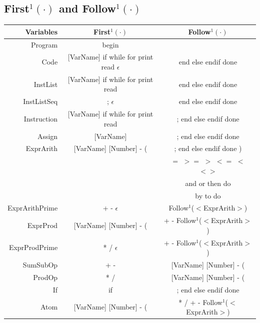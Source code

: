 \documentclass[letterpaper]{article}
\begin{document}
\subsection{First$^1(\cdot)$ and Follow$^1(\cdot)$}
\begin{center}
    \renewcommand{\arraystretch}{1.5}
    \begin{tabular}{| r || c | c |}
        \hline
        \textbf{Variables} & \textbf{First$^1(\cdot)$}
        & \textbf{Follow$^1(\cdot)$} \\
        \hline
        \hline
        Program & begin & \\
        \hline
        Code & [VarName] if while for print read $\epsilon$ &
        end else endif done \\
        \hline
        InstList & [VarName] if while for print read &
        end else endif done \\
        \hline
        InstListSeq & ; $\epsilon$ &
        end else endif done \\
        \hline
        Instruction & [VarName] if while for print read &
        ; end else endif done \\
        \hline
        Assign & [VarName] &
        ; end else endif done \\
        \hline
        ExprArith & [VarName] [Number] - ( &
        ; end else endif done ) \\
        & & $=$ $>=$ $>$ $<=$ $<$ $<>$ \\
        & & and or then do \\
        & &  by to do\\
        \hline
        ExprArithPrime & + - $\epsilon$ &
        Follow$^1$($<$ExprArith$>$) \\
        \hline
        ExprProd & [VarName] [Number] - ( &
        + - Follow$^1$($<$ExprArith$>$) \\
        \hline
        ExprProdPrime & * / $\epsilon$ &
        + - Follow$^1$($<$ExprArith$>$) \\
        \hline
        SumSubOp & + - & [VarName] [Number] - ( \\
        \hline
        ProdOp & * / & [VarName] [Number] - ( \\
        \hline
        If & if & ; end else endif done \\
        \hline
        Atom & [VarName] [Number] - ( &
        * / + - Follow$^1$($<$ExprArith$>$) \\
        \hline

\end{tabular}
\end{center}
\end{document}
